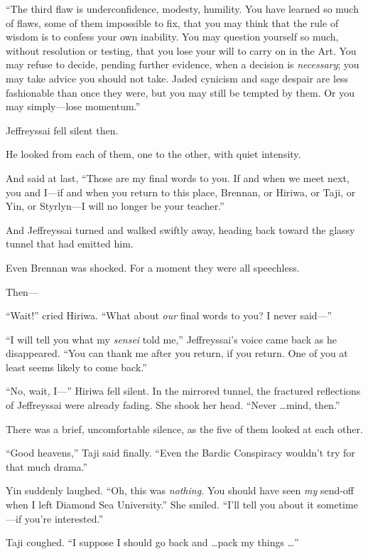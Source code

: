 {
 ``The third flaw is underconfidence, modesty,
humility. You have learned so much of flaws, some of them impossible to
fix, that you may think that the rule of wisdom is to confess your own
inability. You may question yourself so much, without resolution or
testing, that you lose your will to carry on in the Art. You may refuse
to decide, pending further evidence, when a decision is
\textit{necessary}; you may take advice you should not take. Jaded
cynicism and sage despair are less fashionable than once they were, but
you may still be tempted by them. Or you may simply---lose
momentum.''}

{
 Jeffreyssai fell silent then.}

{
 He looked from each of them, one to the other, with quiet
intensity.}

{
 And said at last, ``Those are my final words to
you. If and when we meet next, you and I---if and when you return to
this place, Brennan, or Hiriwa, or Taji, or Yin, or Styrlyn---I will no
longer be your teacher.''}

{
 And Jeffreyssai turned and walked swiftly away, heading back
toward the glassy tunnel that had emitted him.}

{
 Even Brennan was shocked. For a moment they were all speechless.}

{
 Then---}

{
 ``Wait!'' cried Hiriwa.
``What about \textit{our} final words to you? I never
said---''}

{
 ``I will tell you what my \textit{sensei} told
me,'' Jeffreyssai's voice came back
as he disappeared. ``You can thank me after you
return, if you return. One of you at least seems likely to come
back.''}

{
 ``No, wait, I---'' Hiriwa fell
silent. In the mirrored tunnel, the fractured reflections of
Jeffreyssai were already fading. She shook her head.
``Never \ldots mind, then.''}

{
 There was a brief, uncomfortable silence, as the five of them
looked at each other.}

{
 ``Good heavens,'' Taji said
finally. ``Even the Bardic Conspiracy
wouldn't try for that much drama.''}

{
 Yin suddenly laughed. ``Oh, this was
\textit{nothing.} You should have seen \textit{my} send-off when I left
Diamond Sea University.'' She smiled.
``I'll tell you about it sometime---if
you're interested.''}

{
 Taji coughed. ``I suppose I should go back and
\ldots pack my things \ldots''}

